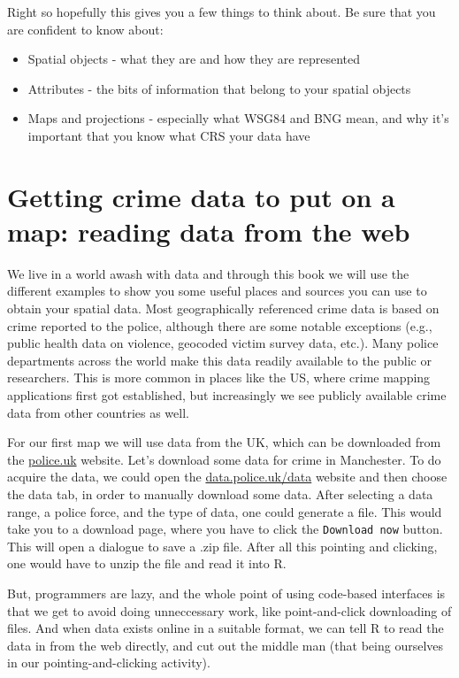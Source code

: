 \documentclass[
]{book}
\providecommand{\tightlist}{%
  \setlength{\itemsep}{0pt}\setlength{\parskip}{0pt}}
\begin{document}
Right so hopefully this gives you a few things to think about. Be sure that you are confident to know about:

\begin{itemize}
\tightlist
\item
  Spatial objects - what they are and how they are represented
\item
  Attributes - the bits of information that belong to your spatial objects
\item
  Maps and projections - especially what WSG84 and BNG mean, and why it's important that you know what CRS your data have
\end{itemize}

\hypertarget{getting-crime-data-to-put-on-a-map-reading-data-from-the-web}{%
\section{Getting crime data to put on a map: reading data from the web}\label{getting-crime-data-to-put-on-a-map-reading-data-from-the-web}}

We live in a world awash with data and through this book we will use the different examples to show you some useful places and sources you can use to obtain your spatial data. Most geographically referenced crime data is based on crime reported to the police, although there are some notable exceptions (e.g., public health data on violence, geocoded victim survey data, etc.). Many police departments across the world make this data readily available to the public or researchers. This is more common in places like the US, where crime mapping applications first got established, but increasingly we see publicly available crime data from other countries as well.

For our first map we will use data from the UK, which can be downloaded from the \href{https://data.police.uk/data/}{police.uk} website. Let's download some data for crime in Manchester. To do acquire the data, we could open the \href{https://data.police.uk/data/}{data.police.uk/data} website and then choose the data tab, in order to manually download some data. After selecting a data range, a police force, and the type of data, one could generate a file. This would take you to a download page, where you have to click the \texttt{Download\ now} button. This will open a dialogue to save a .zip file. After all this pointing and clicking, one would have to unzip the file and read it into R.

But, programmers are lazy, and the whole point of using code-based interfaces is that we get to avoid doing unneccessary work, like point-and-click downloading of files. And when data exists online in a suitable format, we can tell R to read the data in from the web directly, and cut out the middle man (that being ourselves in our pointing-and-clicking activity).
\end{document}
